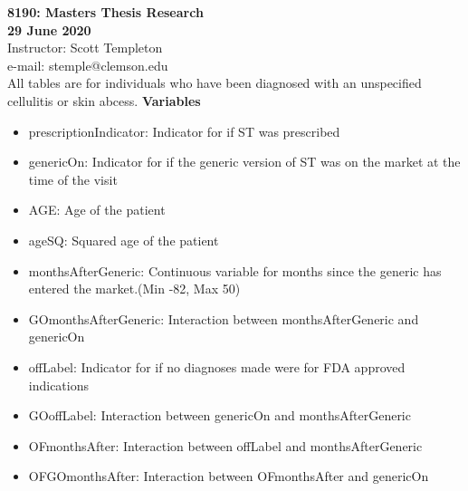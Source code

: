 
\let\counterwithout\relax
\let\counterwithin\relax
{}



\noindent \textbf{8190: Masters Thesis Research}\\
\noindent \textbf{29 June 2020}\\
\noindent Instructor: Scott Templeton \\
e-mail: stemple@clemson.edu\\

\noindent All tables are for individuals who have been diagnosed with an unspecified cellulitis or skin abcess. 
\noindent \textbf{Variables}\\
\begin{itemize}
    \item prescriptionIndicator: Indicator for if ST was prescribed
    \item genericOn: Indicator for if the generic version of ST was on the market at the time of the visit
    \item AGE: Age of the patient
    \item ageSQ: Squared age of the patient
    \item monthsAfterGeneric: Continuous variable for months since the generic has entered the market.(Min -82, Max 50)
    \item GOmonthsAfterGeneric: Interaction between monthsAfterGeneric and genericOn
    \item offLabel: Indicator for if no diagnoses made were for FDA approved indications
    \item GOoffLabel: Interaction between genericOn and monthsAfterGeneric
    \item OFmonthsAfter: Interaction between offLabel and monthsAfterGeneric
    \item OFGOmonthsAfter: Interaction between OFmonthsAfter and genericOn
\end{itemize}
\begin{landscape}

\newpage

\newpage

\newpage

\newpage

\newpage

\newpage

\end{landscape}




